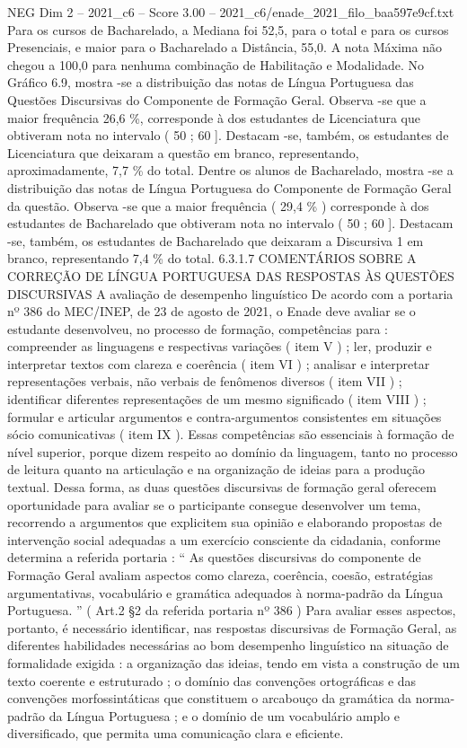 \begin{textsample}{NEG Dim 2 – 2021\_c6 – Score 3.00 – 2021\_c6/enade\_2021\_filo\_baa597e9cf.txt}
Para os cursos de Bacharelado, a Mediana foi 52,5, para o total e para os cursos Presenciais, e maior para o Bacharelado a Distância, 55,0.
A nota Máxima não chegou a 100,0 para nenhuma combinação de Habilitação e Modalidade.
No Gráfico 6.9, mostra -se a distribuição das notas de Língua Portuguesa das Questões Discursivas do Componente de Formação Geral.
Observa -se que a maior frequência 26,6 \%, corresponde à dos estudantes de Licenciatura que obtiveram nota no intervalo ( 50 ; 60 ].
Destacam -se, também, os estudantes de Licenciatura que deixaram a questão em branco, representando, aproximadamente, 7,7 \% do total.
Dentre os alunos de Bacharelado, mostra -se a distribuição das notas de Língua Portuguesa do Componente de Formação Geral da questão.
Observa -se que a maior frequência ( 29,4 \% ) corresponde à dos estudantes de Bacharelado que obtiveram nota no intervalo ( 50 ; 60 ].
Destacam -se, também, os estudantes de Bacharelado que deixaram a Discursiva 1 em branco, representando 7,4 \% do total. 6.3.1.7 COMENTÁRIOS SOBRE A CORREÇÃO DE LÍNGUA PORTUGUESA DAS RESPOSTAS ÀS QUESTÕES DISCURSIVAS A avaliação de desempenho linguístico De acordo com a portaria nº 386 do MEC/INEP, de 23 de agosto de 2021, o Enade deve avaliar se o estudante desenvolveu, no processo de formação, competências para : compreender as linguagens e respectivas variações ( item V ) ; ler, produzir e interpretar textos com clareza e coerência ( item VI ) ; analisar e interpretar representações verbais, não verbais de fenômenos diversos ( item VII ) ; identificar diferentes representações de um mesmo significado ( item VIII ) ; formular e articular argumentos e contra-argumentos consistentes em situações sócio comunicativas ( item IX ).
Essas competências são essenciais à formação de nível superior, porque dizem respeito ao domínio da linguagem, tanto no processo de leitura quanto na articulação e na organização de ideias para a produção textual.
Dessa forma, as duas questões discursivas de formação geral oferecem oportunidade para avaliar se o participante consegue desenvolver um tema, recorrendo a argumentos que explicitem sua opinião e elaborando propostas de intervenção social adequadas a um exercício consciente da cidadania, conforme determina a referida portaria : “ As questões discursivas do componente de Formação Geral avaliam aspectos como clareza, coerência, coesão, estratégias argumentativas, vocabulário e gramática adequados à norma-padrão da Língua Portuguesa. ” ( Art.2 §2 da referida portaria nº 386 ) Para avaliar esses aspectos, portanto, é necessário identificar, nas respostas discursivas de Formação Geral, as diferentes habilidades necessárias ao bom desempenho linguístico na situação de formalidade exigida : a organização das ideias, tendo em vista a construção de um texto coerente e estruturado ; o domínio das convenções ortográficas e das convenções morfossintáticas que constituem o arcabouço da gramática da norma-padrão da Língua Portuguesa ; e o domínio de um vocabulário amplo e diversificado, que permita uma comunicação clara e eficiente.

\end{textsample}
